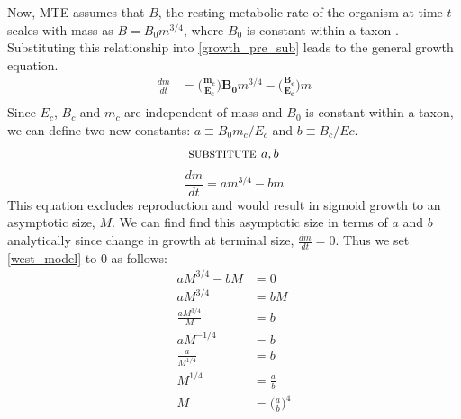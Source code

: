\documentclass[a4paper]{article} %
\begin{document}
Now, MTE assumes that $B$, the resting metabolic rate of the organism at time $t$ scales with mass as $B = B_{0}m^{3/4}$, where $B_0$ is constant within a taxon \autocite{West1997,brown2000-scaling-book, Brown2004}. Substituting this relationship into \eqref{growth_pre_sub} leads to the general growth equation.
\begin{align*}
    \frac{dm}{dt} &= \bm{\Bigg(\frac{m_c}{E_c}\Bigg)B_{0}}m^{3/4} - \bm{\Bigg(\frac{B_{c}}{E_c}\Bigg)}m \\
\end{align*}
Since $E_c$, $B_c$ and $m_c$ are independent of mass and $B_0$ is constant within a taxon, we can define two new constants: $a \equiv B_{0}m_{c}/E_{c}$ and $b \equiv B_{c}/E{c}$.
\begin{align*}
    \textsc{substitute }a, b
\end{align*}
\begin{equation}
    \frac{dm}{dt} = am^{3/4} - bm \label{west_model}
\end{equation}
This equation excludes reproduction and would result in sigmoid growth to an asymptotic size, $M$. We can find find this asymptotic size in terms of $a$ and $b$ analytically since change in growth at terminal size, $\frac{dm}{dt} = 0$. Thus we set \eqref{west_model} to 0 as follows:
\begin{align*}
    aM^{3/4} - bM &= 0 \\
    aM^{3/4} &= bM \\
    \frac{aM^{3/4}}{M} &= b \\
    aM^{-1/4} &= b \\
    \frac{a}{M^{1/4}} &= b \\
    M^{1/4} &= \frac{a}{b} \\
    M &= \Big(\frac{a}{b}\Big)^4
\end{align*}
\end{document}
